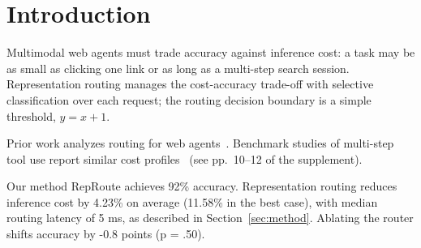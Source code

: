 \newcommand{\method}{RepRoute}

\section{Introduction}\label{sec:intro}

Multimodal web agents must trade accuracy against inference cost: a task may
be as small as clicking one link or as long as a multi-step search session.
Representation routing manages the cost-accuracy trade-off with selective
classification over each request; the routing decision boundary is a simple
threshold, $y = x + 1$.

Prior work analyzes routing for web agents~\cite{wang2025routing}.
Benchmark studies of multi-step tool use report similar cost
profiles~\cite{chen2024agents} (see pp.~10--12 of the supplement).

Our method \method{} achieves 92\% accuracy. Representation routing reduces
inference cost by 4.23\% on average (11.58\% in the best case), with median
routing latency of 5 ms, as described in Section~\ref{sec:method}. Ablating
the router shifts accuracy by -0.8 points (p = .50).
